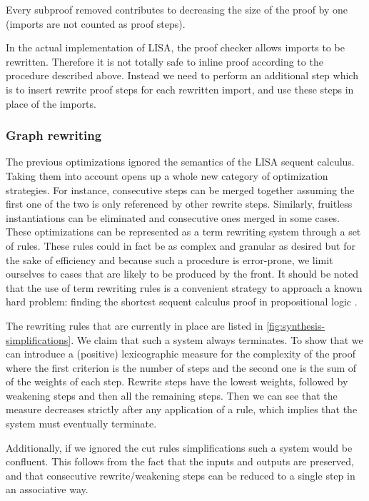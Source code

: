 Every subproof removed contributes to decreasing the size of the proof by one (imports are not counted as proof steps).

In the actual implementation of LISA, the proof checker allows imports to be rewritten. Therefore it is not totally safe to inline proof according to the procedure described above. Instead we need to perform an additional step which is to insert rewrite proof steps for each rewritten import, and use these steps in place of the imports.

\subsubsection{Graph rewriting}

The previous optimizations ignored the semantics of the LISA sequent calculus. Taking them into account opens up a whole new category of optimization strategies.
For instance, consecutive  steps can be merged together assuming the first one of the two is only referenced by other rewrite steps. Similarly, fruitless instantiations can be eliminated and consecutive ones merged in some cases. These optimizations can be represented as a term rewriting system through a set of rules. These rules could in fact be as complex and granular as desired but for the sake of efficiency and because such a procedure is error-prone, we limit ourselves to cases that are likely to be produced by the front. It should be noted that the use of term rewriting rules is a convenient strategy to approach a known hard problem: finding the shortest sequent calculus proof in propositional logic \cite{Krajicek1994}.

The rewriting rules that are currently in place are listed in \autoref{fig:synthesis-simplifications}. We claim that such a system always terminates. To show that we can introduce a (positive) lexicographic measure for the complexity of the proof where the first criterion is the number of steps and the second one is the sum of of the weights of each step. Rewrite steps have the lowest weights, followed by weakening steps and then all the remaining steps. Then we can see that the measure decreases strictly after any application of a rule, which implies that the system must eventually terminate.

Additionally, if we ignored the cut rules simplifications such a system would be confluent. This follows from the fact that the inputs and outputs are preserved, and that consecutive rewrite/weakening steps can be reduced to a single step in an associative way.

